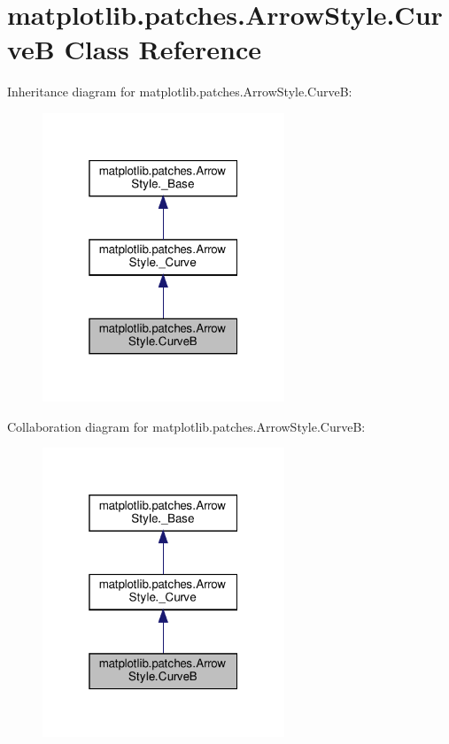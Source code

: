 \hypertarget{classmatplotlib_1_1patches_1_1ArrowStyle_1_1CurveB}{}\section{matplotlib.\+patches.\+Arrow\+Style.\+CurveB Class Reference}
\label{classmatplotlib_1_1patches_1_1ArrowStyle_1_1CurveB}


Inheritance diagram for matplotlib.\+patches.\+Arrow\+Style.\+CurveB\+:
\nopagebreak
\begin{figure}[H]
\begin{center}
\leavevmode
\includegraphics[width=205pt]{classmatplotlib_1_1patches_1_1ArrowStyle_1_1CurveB__inherit__graph}
\end{center}
\end{figure}


Collaboration diagram for matplotlib.\+patches.\+Arrow\+Style.\+CurveB\+:
\nopagebreak
\begin{figure}[H]
\begin{center}
\leavevmode
\includegraphics[width=205pt]{classmatplotlib_1_1patches_1_1ArrowStyle_1_1CurveB__coll__graph}
\end{center}
\end{figure}
